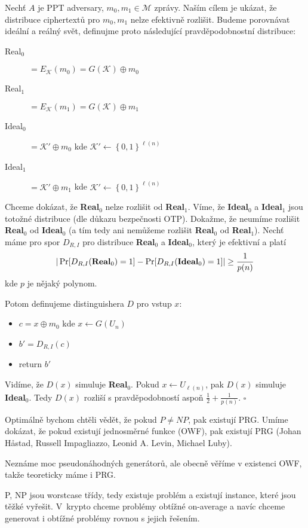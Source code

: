 \documentclass[a4paper,12pt,titlepage]{article}
\def\dukaz{\noindent {\bf Důkaz: }}
\def\qed{{\hfill{$\square$}}}
\def\m#1{{\mathcal{#1}}}
\begin{document}
\dukaz Nechť $A$ je PPT adversary, $m_0, m_1 \in \mathcal{M}$ zprávy.
Naším cílem je ukázat, že distribuce ciphertextů pro $m_0, m_1$ nelze efektivně rozlišit.
Budeme porovnávat ideální a reálný svět, definujme proto následující pravděpodobnostní distribuce:
\begin{description}
	\item[Real$_0$] $= E_{\m K}(m_0) = G(\m K) \oplus m_0$
	\item[Real$_1$] $= E_{\m K}(m_1) = G(\m K) \oplus m_1$
	\item[Ideal$_0$] $= \m K' \oplus m_0$ kde $\m K' \leftarrow \left\{ 0,1 \right\}^{\ell(n)}$
	\item[Ideal$_1$] $= \m K' \oplus m_1$ kde $\m K' \leftarrow \left\{ 0,1 \right\}^{\ell(n)}$
\end{description}
Chceme dokázat, že \textbf{Real$_0$} nelze rozlišit od  \textbf{Real$_1$}.
Víme, že  \textbf{Ideal$_0$} a \textbf{Ideal$_1$} jsou totožné distribuce (dle důkazu bezpečnosti OTP).
Dokažme, že neumíme rozlišit \textbf{Real$_0$} od \textbf{Ideal$_0$} (a tím tedy ani nemůžeme rozlišit \textbf{Real$_0$} od \textbf{Real$_1$}).
Nechť máme pro spor $D_{R, I}$ pro distribuce  \textbf{Real$_0$} a  \textbf{Ideal$_0$}, který je efektivní a platí
$$|\Pr[D_{R,I}(\text{\textbf{Real}}_0) = 1] - \Pr[D_{R,I}(\text{\textbf{Ideal}}_0) = 1]| \geq \frac{1}{p(n)}$$
kde $p$ je nějaký polynom.

Potom definujeme distinguishera $D$ pro vstup $x$:
\begin{itemize}
	\item  $c = x \oplus m_0$ kde $x \leftarrow G(U_n)$
	\item  $b' = D_{R,I}(c)$
	\item  return $b'$
\end{itemize}
Vidíme, že $D(x)$ simuluje \textbf{Real}$_0$.
Pokud $x \leftarrow U_{\ell(n)}$, pak $D(x)$ simuluje \textbf{Ideal}$_0$.
Tedy $D(x)$ rozliší s pravděpodobností aspoň $\frac{1}{2} + \frac{1}{p(n)}$.
\qed

Optimálně bychom chtěli vědět, že pokud $P \neq NP$, pak existují PRG.
Umíme dokázat, že pokud existují jednosměrné funkce (OWF), pak existují PRG (Johan Håstad,	Russell Impagliazzo,	Leonid A. Levin, Michael Luby).

Neznáme moc pseudonáhodných generátorů, ale obecně věříme v existenci OWF, takže teoreticky máme i PRG.

P, NP jsou worstcase třídy, tedy existuje problém a existují instance, které jsou těžké vyřešit.
V~krypto chceme problémy obtížné on-average a navíc chceme generovat i obtížné problémy rovnou s jejich řešením.
\end{document}
